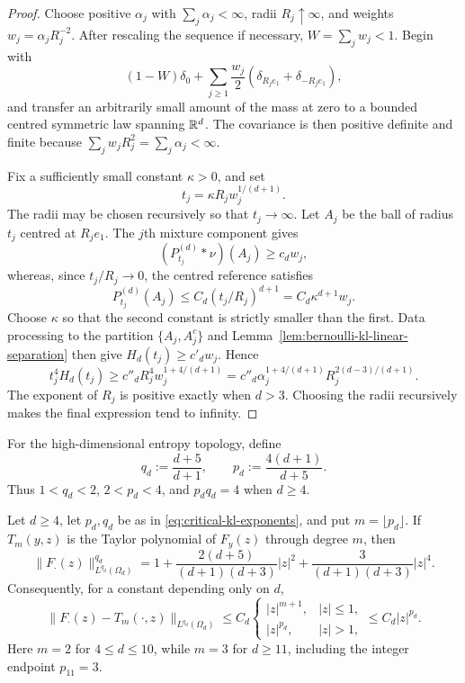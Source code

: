 \begin{proof}
Choose positive \(\alpha_j\) with \(\sum_j\alpha_j<\infty\), radii
\(R_j\uparrow\infty\), and weights
\(w_j=\alpha_jR_j^{-2}\).  After rescaling the sequence if necessary,
\(W=\sum_jw_j<1\).  Begin with
\[
 (1-W)\delta_0+\sum_{j\ge1}\frac{w_j}{2}
 (\delta_{R_je_1}+\delta_{-R_je_1}),
\]
and transfer an arbitrarily small amount of the mass at zero to a bounded
centred symmetric law spanning \(\mathbb{R}^d\).  The covariance is then positive
definite and finite because \(\sum_jw_jR_j^2=\sum_j\alpha_j<\infty\).

Fix a sufficiently small constant \(\kappa>0\), and set
\[
 t_j=\kappa R_jw_j^{1/(d+1)}.
\]
The radii may be chosen recursively so that \(t_j\to\infty\).  Let \(A_j\)
be the ball of radius \(t_j\) centred at \(R_je_1\).  The \(j\)th mixture
component gives
\[
 (P_{t_j}^{(d)}*\nu)(A_j)\ge c_dw_j,
\]
whereas, since \(t_j/R_j\to0\), the centred reference satisfies
\[
 P_{t_j}^{(d)}(A_j)
 \le C_d(t_j/R_j)^{d+1}
 =C_d\kappa^{d+1}w_j.
\]
Choose \(\kappa\) so that the second constant is strictly smaller than the
first.  Data processing to the partition \(\{A_j,A_j^c\}\) and
Lemma~\ref{lem:bernoulli-kl-linear-separation} then give
\(H_d(t_j)\ge c'_dw_j\).  Hence
\[
 t_j^4H_d(t_j)
 \ge c''_dR_j^4w_j^{1+4/(d+1)}
 =c''_d\alpha_j^{1+4/(d+1)}
 R_j^{2(d-3)/(d+1)}.
\]
The exponent of \(R_j\) is positive exactly when \(d>3\).  Choosing the
radii recursively makes the final expression tend to infinity.
\end{proof}

For the high-dimensional entropy topology, define
\begin{equation}\label{eq:critical-kl-exponents}
 q_d:=\frac{d+5}{d+1},
 \qquad
 p_d:=\frac{4(d+1)}{d+5}.
\end{equation}
Thus \(1<q_d<2\), \(2<p_d<4\), and \(p_dq_d=4\) when \(d\ge4\).

\begin{lemma}
\label{lem:critical-lq-translation-remainder}
Let \(d\ge4\), let \(p_d,q_d\) be as in
\eqref{eq:critical-kl-exponents}, and put \(m=\lfloor p_d\rfloor\).
If \(T_m(y,z)\) is the Taylor polynomial of \(F_y(z)\) through degree
\(m\), then
\begin{equation}\label{eq:critical-lq-exact-translation-norm}
 \|F_\cdot(z)\|_{L^{q_d}(\Omega_d)}^{q_d}
 =1+\frac{2(d+5)}{(d+1)(d+3)}|z|^2
 +\frac{3}{(d+1)(d+3)}|z|^4.
\end{equation}
Consequently, for a constant depending only on \(d\),
\begin{equation}\label{eq:critical-lq-global-remainder}
 \|F_\cdot(z)-T_m(\cdot,z)\|_{L^{q_d}(\Omega_d)}
 \le C_d
 \begin{cases}
 |z|^{m+1},& |z|\le1,\\
 |z|^{p_d},& |z|>1,
 \end{cases}
 \le C_d|z|^{p_d}.
\end{equation}
Here \(m=2\) for \(4\le d\le10\), while \(m=3\) for \(d\ge11\),
including the integer endpoint \(p_{11}=3\).
\end{lemma}

